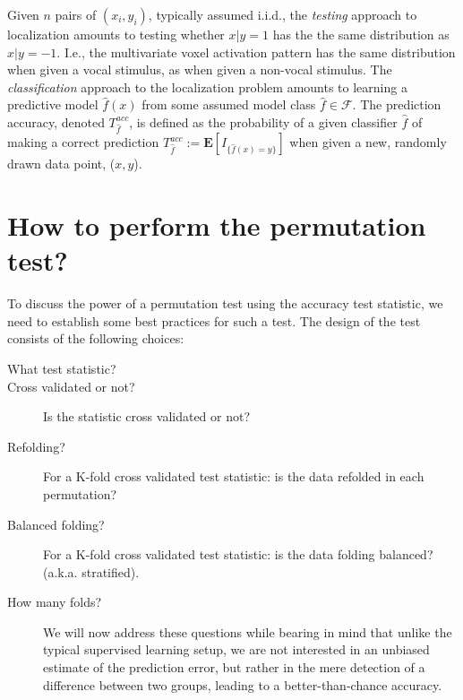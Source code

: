 \documentclass{pnastwo}
\newcommand{\set}[1]{\{ #1 \}} %
\newcommand{\indicator}[1]{I_{\set{#1}}} %
\newcommand{\features}{x} %
\newcommand{\outcomes}{y} %
\newcommand{\hyp}{f} %
\newcommand{\hypEstim}{\hat{\hyp}} %
\newcommand{\hypclass}{\mathcal{F}}
\newcommand{\expect}[1]{\mathbf{E}\left[ #1 \right]} %
\newcommand{\acc}{T^{acc}}
\begin{document}
\begin{article}
Given $n$ pairs of $(\features_i,\outcomes_i)$, typically assumed i.i.d., the \emph{testing} approach to localization amounts to testing whether $\features|\outcomes=1$ has the the same distribution as $\features|\outcomes=-1$.
I.e., the multivariate voxel activation pattern has the same distribution when given a vocal stimulus, as when given a non-vocal stimulus. 
The \emph{classification} approach to the localization problem amounts to learning a predictive model $\hypEstim(\features)$ from some assumed model class $\hypEstim \in \hypclass$. 
The prediction accuracy, denoted $\acc_{\hypEstim}$, is defined as the probability of a given classifier $\hypEstim$ of making a correct prediction $\acc_{\hypEstim}:=\expect{\indicator{\hypEstim(x)=y}}$ when given a new, randomly drawn data point, ($\features,\outcomes$).





\section{How to perform the permutation test?}

To discuss the power of a permutation test using the accuracy test statistic, we need to establish some best practices for such a test. 
The design of the test consists of the following choices: 
\begin{description}
\item [What test statistic?] 
\item [Cross validated or not?] Is the statistic cross validated or not?
\item [Refolding?] For a K-fold cross validated test statistic: is the data refolded in each permutation? 
\item [Balanced folding?] For a K-fold cross validated test statistic: is the data folding balanced? (a.k.a. stratified).
\item [How many folds?] 

We will now address these questions while bearing in mind that unlike the typical supervised learning setup, we are not interested in an unbiased estimate of the prediction error, but rather in the mere detection of a difference between two groups, leading to a better-than-chance accuracy. 



\end{description}
\end{article}
\end{document}
